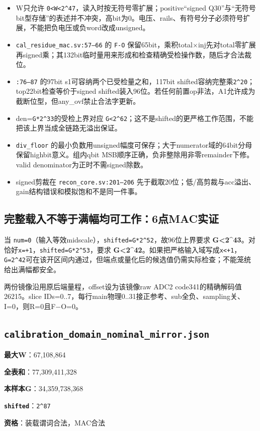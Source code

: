 \documentclass[UTF8,fontset=fandol,10pt,a4paper,openany]{ctexrep}
\newcommand{\code}[1]{\nolinkurl{#1}}
\begin{document}
\begin{itemize}
\item W只允许 \code{0<W<2^47}，读入时按无符号零扩展；positive“signed Q30”与“无符号 bit型存储”的表述并不冲突，高bit为0。电压、rails、有符号分子必须符号扩展，不能把负电压或负word改成unsigned。
\item \code{cal_residue_mac.sv:57–66} 的 \code{F-O} 保留65bit，乘积total\ensuremath{\times}inj先对total零扩展再signed乘；其132bit临时量用来形成和检查精确受检操作数，随后才合法裁位。
\item \code{:76–87} 的97bit s1可容纳两个已受检量之和，117bit shifted容纳完整乘\code{2^20}；top22bit检查等价于signed shifted装入96位。若任何前置op非法，A1允许成为截断位型，但any\_ovf禁止合法字更新。
\item den=\code{G*2^33}的受检上界对应 \code{G<2^62}；这不是shifted的更严格工作范围，不能把该上界当成全链路无溢出保证。
\item \code{div_floor} 的最小负数用unsigned幅度可保存；大于numerator域的64bit分母保留highbit意义。组内qbit MSB顺序正确，负非整除用非零remainder下修。valid denominator为正时不需signed除数。
\item signed剪裁在 \code{recon_core.sv:201–206} 先于截取20位；低/高剪裁与acc溢出、gain结构错误和模拟饱和不是同一件事。
\end{itemize}


\subsection{完整载入不等于满幅均可工作：6点MAC实证}


当 \code{num=0}（输入等效midscale），\code{shifted=G*2^52}，故96位上界要求 \textbf{G<2\textasciicircum{}43}。对恰好\code{x=+1}，\code{shifted=G*2^53}，要求 \textbf{G<2\textasciicircum{}42}。如果把严格输入域写成\code{x<+1}，\code{G=2^42}可在该开区间内通过，但端点或量化后的候选值仍需实际检查；不能笼统给出满幅都安全。


两份镜像沿用原后端量程，offset设为该镜像raw ADC2 code341的精确解码值26215。slice IDs=0..7，每行main物理0..31接正参考、sub全负、sampling关、I=0，则R=0且F\ensuremath{-}O=0。


\subsection*{\code{calibration_domain_nominal_mirror.json}}
\noindent\textbf{最大W}：67,108,864\par
\noindent\textbf{全表和}：77,309,411,328\par
\noindent\textbf{本样本G}：34,359,738,368\par
\noindent\textbf{\code{shifted}}：\code{2^87}\par
\noindent\textbf{资格}：装载谓词合法，MAC合法\par
\end{document}
